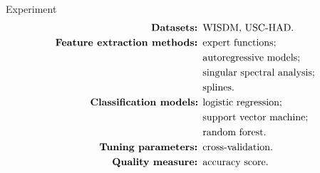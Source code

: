 \documentclass{beamer}
\begin{document}
\begin{frame}{Experiment}
		\begin{align*}
			\text{\textbf{Datasets: }} &\text{WISDM, USC-HAD.}\\
		\text{\textbf{Feature extraction methods: }} &\text{expert functions;}\\ &\text{autoregressive models;}\\ &\text{singular spectral analysis;}\\ &\text{splines.}\\
		\text{\textbf{Classification models:} } &\text{logistic regression;}\\ &\text{support vector machine;}\\ &\text{random forest.}\\
		\text{\textbf{Tuning parameters: }} &\text{cross-validation.}\\
		\text{\textbf{Quality measure: }} &\text{accuracy score.}
		\end{align*}

\end{frame}
\end{document}
